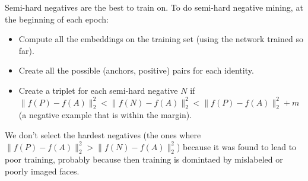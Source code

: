 Semi-hard negatives are the best to train on.
To do semi-hard negative mining, at the beginning of each epoch:
\begin{itemize}
  \item Compute all the embeddings on the training set (using the network trained so far).
  \item Create all the possible (anchors, positive) pairs for each identity.
  \item Create a triplet for each semi-hard negative $N$ if $\| f(P) - f(A) \|_2^2 < \| f(N) - f(A) \|_2^2 < \| f(P) - f(A) \|_2^2 + m$ (a negative example that is within the margin).
\end{itemize}

We don't select the hardest negatives (the ones where $\| f(P) - f(A) \|_2^2 > \| f(N) - f(A) \|_2^2$) because it was found to lead to poor training, probably because then training is domintaed by mislabeled or poorly imaged faces.

